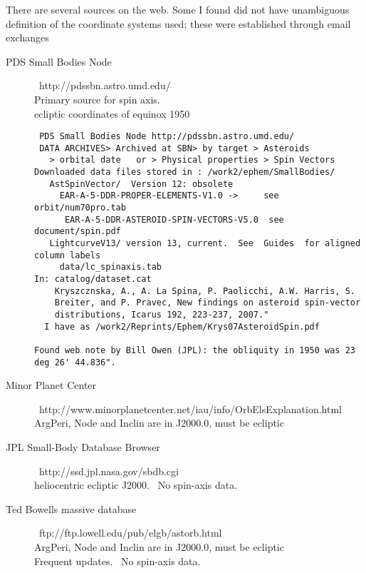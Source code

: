 \documentclass[draft]{article}
\newcommand{\qii}{\\ \hspace*{4.em}}     %
\begin{document}
There are several sources on the web. Some I found did not have unambiguous definition of the coordinate systems used; these were established through email exchanges
\begin{description}  %

\item [PDS Small Bodies Node] \  http://pdssbn.astro.umd.edu/
\\ Primary source for spin axis. 
 \qii ecliptic coordinates of equinox 1950\vspace{-3.mm} 
\begin{verbatim}
 PDS Small Bodies Node http://pdssbn.astro.umd.edu/ 
 DATA ARCHIVES> Archived at SBN> by target > Asteroids
   > orbital date   or > Physical properties > Spin Vectors
Downloaded data files stored in : /work2/ephem/SmallBodies/ 
   AstSpinVector/  Version 12: obsolete
     EAR-A-5-DDR-PROPER-ELEMENTS-V1.0 ->     see orbit/num70pro.tab
      EAR-A-5-DDR-ASTEROID-SPIN-VECTORS-V5.0  see document/spin.pdf
   LightcurveV13/ version 13, current.  See  Guides  for aligned column labels
     data/lc_spinaxis.tab
In: catalog/dataset.cat                                                        
    Kryszcznska, A., A. La Spina, P. Paolicchi, A.W. Harris, S.               
    Breiter, and P. Pravec, New findings on asteroid spin-vector              
    distributions, Icarus 192, 223-237, 2007."   
  I have as /work2/Reprints/Ephem/Krys07AsteroidSpin.pdf 

Found web note by Bill Owen (JPL): the obliquity in 1950 was 23 deg 26' 44.836".     
\end{verbatim}

\item [Minor Planet Center]  \  http://www.minorplanetcenter.net/iau/info/OrbElsExplanation.html 
\\ ArgPeri, Node and Inclin are in J2000.0,  must be ecliptic

\item [JPL Small-Body Database Browser]  \ http://ssd.jpl.nasa.gov/sbdb.cgi
\\ heliocentric ecliptic J2000. \ No spin-axis data.

\item [Ted Bowells massive database]   \ ftp://ftp.lowell.edu/pub/elgb/astorb.html
\\ ArgPeri, Node and Inclin are in J2000.0,  must be ecliptic
\\ Frequent updates.  \ No spin-axis data.

\end{description}
\end{document}
